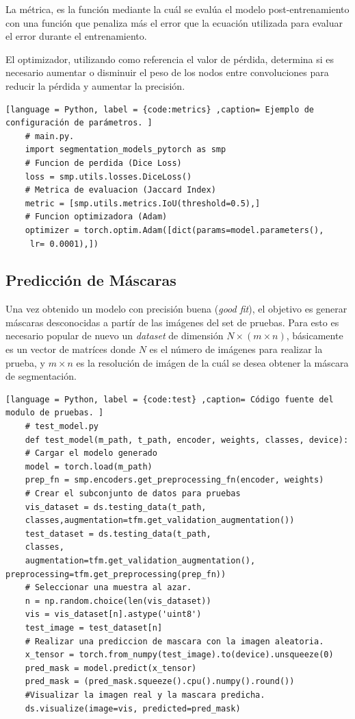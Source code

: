 La métrica, es la función mediante la cuál se evalúa el modelo post-entrenamiento con una función que penaliza más el error que la ecuación utilizada para evaluar el error durante el entrenamiento.

El optimizador, utilizando como referencia el valor de pérdida, determina si es necesario aumentar o disminuir el peso de los nodos entre convoluciones para reducir la pérdida y aumentar la precisión.

\begin{lstlisting}[language = Python, label = {code:metrics} ,caption= Ejemplo de configuración de parámetros. ]
    # main.py.
    import segmentation_models_pytorch as smp
    # Funcion de perdida (Dice Loss)
    loss = smp.utils.losses.DiceLoss() 
    # Metrica de evaluacion (Jaccard Index)
    metric = [smp.utils.metrics.IoU(threshold=0.5),]
    # Funcion optimizadora (Adam)
    optimizer = torch.optim.Adam([dict(params=model.parameters(),
     lr= 0.0001),])
\end{lstlisting}

\subsection{Predicción de Máscaras} 
Una vez obtenido un modelo con precisión buena (\emph{good fit}), el objetivo es generar máscaras desconocidas a partír de las imágenes del set de pruebas. Para esto es necesario popular de nuevo un \emph{dataset} de dimensión $N \times (m \times n)$, básicamente es un vector de matríces donde $N$ es el número de imágenes para realizar la prueba, y $m \times n$ es la resolución de imágen de la cuál se desea obtener la máscara de segmentación.

\begin{lstlisting}[language = Python, label = {code:test} ,caption= Código fuente del modulo de pruebas. ]
    # test_model.py
    def test_model(m_path, t_path, encoder, weights, classes, device):
    # Cargar el modelo generado
    model = torch.load(m_path)
    prep_fn = smp.encoders.get_preprocessing_fn(encoder, weights)
    # Crear el subconjunto de datos para pruebas
    vis_dataset = ds.testing_data(t_path,
    classes,augmentation=tfm.get_validation_augmentation())
    test_dataset = ds.testing_data(t_path,
    classes, 
    augmentation=tfm.get_validation_augmentation(), preprocessing=tfm.get_preprocessing(prep_fn))
    # Seleccionar una muestra al azar.
    n = np.random.choice(len(vis_dataset))
    vis = vis_dataset[n].astype('uint8')
    test_image = test_dataset[n]
    # Realizar una prediccion de mascara con la imagen aleatoria.
    x_tensor = torch.from_numpy(test_image).to(device).unsqueeze(0)
    pred_mask = model.predict(x_tensor)
    pred_mask = (pred_mask.squeeze().cpu().numpy().round())
    #Visualizar la imagen real y la mascara predicha.
    ds.visualize(image=vis, predicted=pred_mask)
\end{lstlisting}

